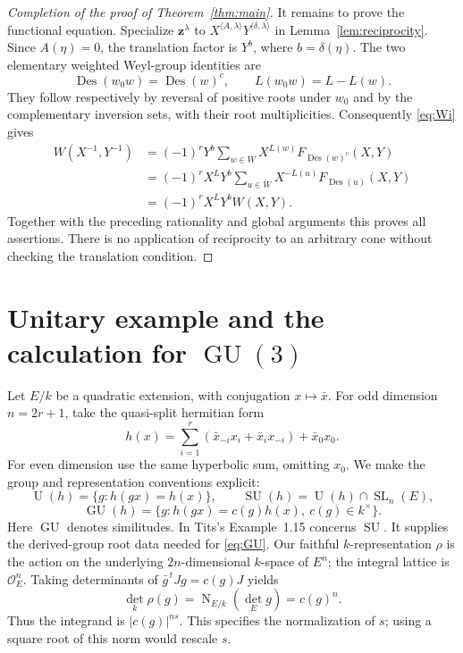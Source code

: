 \documentclass[11pt,a4paper]{article}
\theoremstyle{definition}
\newcommand{\OO}{\mathcal O}
\newcommand{\GU}{\operatorname{GU}}
\newcommand{\SU}{\operatorname{SU}}
\newcommand{\UU}{\operatorname U}
\newcommand{\SL}{\operatorname{SL}}
\newcommand{\Des}{\operatorname{Des}}
\newcommand{\N}{\operatorname N}
\begin{document}
\begin{proof}[Completion of the proof of Theorem~\ref{thm:main}]
It remains to prove the functional equation. Specialize
$\mathbf z^\lambda$ to
$X^{\langle A,\lambda\rangle}Y^{\langle\delta,\lambda\rangle}$
in Lemma~\ref{lem:reciprocity}. Since $A(\eta)=0$, the translation
factor is $Y^b$, where $b=\delta(\eta)$. The two elementary
weighted Weyl-group identities are
\[
 \Des(w_0w)=\Des(w)^c,\qquad L(w_0w)=L-L(w).
\]
They follow respectively by reversal of positive roots under $w_0$
and by the complementary inversion sets, with their root multiplicities.
Consequently \eqref{eq:Wi} gives
\begin{align*}
 W(X^{-1},Y^{-1})
  &=(-1)^rY^b\sum_{w\in W}X^{L(w)}F_{\Des(w)^c}(X,Y)\\
  &=(-1)^rX^LY^b\sum_{u\in W}X^{-L(u)}F_{\Des(u)}(X,Y)\\
  &=(-1)^rX^LY^bW(X,Y).
\end{align*}
Together with the preceding rationality and global arguments this proves
all assertions. There is no application of reciprocity to an arbitrary
cone without checking the translation condition.
\end{proof}

\section{Unitary example and the calculation for \texorpdfstring{$\GU(3)$}{GU(3)}}
\label{sec:GU3}
Let $E/k$ be a quadratic extension, with conjugation $x\mapsto\bar x$.
For odd dimension $n=2r+1$, take the quasi-split hermitian form
\begin{equation}\label{eq:hermitian}
 h(x)=\sum_{i=1}^r(\bar x_{-i}x_i+\bar x_ix_{-i})+\bar x_0x_0.
\end{equation}
For even dimension use the same hyperbolic sum, omitting $x_0$.
We make the group and representation conventions explicit:
\[
 \UU(h)=\{g:h(gx)=h(x)\},\qquad
 \SU(h)=\UU(h)\cap\SL_n(E),
\]
\begin{equation}\label{eq:GU}
 \GU(h)=\{g:h(gx)=c(g)h(x),\ c(g)\in k^\times\}.
\end{equation}
Here $\GU$ denotes similitudes. In \cite{Tits} Tits's Example~1.15 concerns $\SU$.
It supplies the derived-group root data needed for \eqref{eq:GU}.
Our faithful $k$-representation $\rho$ is the action on the underlying
$2n$-dimensional $k$-space of $E^n$; the integral lattice is $\OO_E^n$.
Taking determinants of $\bar g^{\,t}Jg=c(g)J$ yields
\begin{equation}\label{eq:detnorm}
 \det_k\rho(g)=\N_{E/k}(\det_Eg)=c(g)^n.
\end{equation}
Thus the integrand is $|c(g)|^{ns}$. This specifies the normalization
of $s$; using a square root of this norm would rescale $s$.
\end{document}
